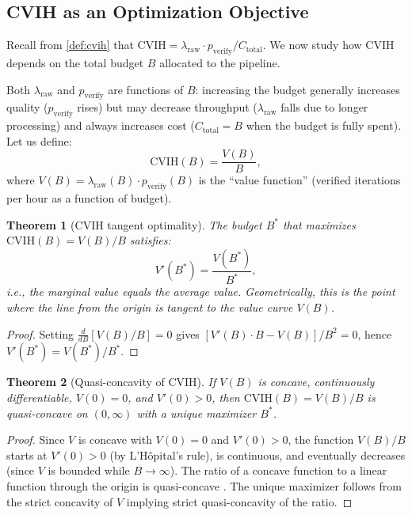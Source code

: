\documentclass[11pt, a4paper, copyright]{googledeepmind}
\newtheorem{theorem}{Theorem}[section]
\begin{document}
\subsection{CVIH as an Optimization Objective}

Recall from \cref{def:cvih} that $\text{CVIH} = \lambda_{\text{raw}} \cdot p_{\text{verify}} / C_{\text{total}}$. We now study how CVIH depends on the total budget $B$ allocated to the pipeline.

Both $\lambda_{\text{raw}}$ and $p_{\text{verify}}$ are functions of $B$: increasing the budget generally increases quality ($p_{\text{verify}}$ rises) but may decrease throughput ($\lambda_{\text{raw}}$ falls due to longer processing) and always increases cost ($C_{\text{total}} = B$ when the budget is fully spent). Let us define:
\begin{equation}\label{eq:cvih-budget}
    \text{CVIH}(B) = \frac{V(B)}{B},
\end{equation}
where $V(B) = \lambda_{\text{raw}}(B) \cdot p_{\text{verify}}(B)$ is the ``value function'' (verified iterations per hour as a function of budget).

\begin{theorem}[CVIH tangent optimality]\label{thm:cvih-tangent}
The budget $B^*$ that maximizes $\text{CVIH}(B) = V(B)/B$ satisfies:
\begin{equation}\label{eq:cvih-tangent}
    V'(B^*) = \frac{V(B^*)}{B^*},
\end{equation}
i.e., the marginal value equals the average value. Geometrically, this is the point where the line from the origin is tangent to the value curve $V(B)$.
\end{theorem}

\begin{proof}
Setting $\frac{d}{dB}[V(B)/B] = 0$ gives $[V'(B) \cdot B - V(B)] / B^2 = 0$, hence $V'(B^*) = V(B^*)/B^*$.
\end{proof}

\begin{theorem}[Quasi-concavity of CVIH]\label{thm:cvih-quasi}
If $V(B)$ is concave, continuously differentiable, $V(0) = 0$, and $V'(0) > 0$, then $\text{CVIH}(B) = V(B)/B$ is quasi-concave on $(0, \infty)$ with a unique maximizer $B^*$.
\end{theorem}

\begin{proof}
Since $V$ is concave with $V(0) = 0$ and $V'(0) > 0$, the function $V(B)/B$ starts at $V'(0) > 0$ (by L'H\^{o}pital's rule), is continuous, and eventually decreases (since $V$ is bounded while $B \to \infty$). The ratio of a concave function to a linear function through the origin is quasi-concave \citep{boyd2004}. The unique maximizer follows from the strict concavity of $V$ implying strict quasi-concavity of the ratio.
\end{proof}
\end{document}
